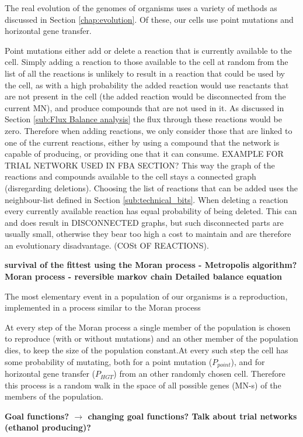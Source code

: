 \documentclass[10pt,a4paper]{article}
\begin{document}
	The real evolution of the genomes of organisms uses a variety of methods as discussed in Section \ref{chap:evolution}. Of these, our cells use point mutations and horizontal gene transfer.
	
	Point mutations either add or delete a reaction that is currently available to the cell. Simply adding a reaction to those available to the cell at random from the list of all the reactions is unlikely to result in a reaction that could be used by the cell, as with a high probability the added reaction would use reactants that are not present in the cell (the added reaction would be disconnected from the current MN), and produce compounds that are not used in it. As discussed in Section \ref{sub:Flux Balance analysis} the flux through these reactions would be zero. Therefore when adding reactions, we only consider those that are linked  to one of the current reactions, either by using a compound that  the network is capable of producing, or providing one that it can consume. EXAMPLE FOR TRIAL NETWORK USED IN FBA SECTION? This way the graph of the reactions and compounds available to the cell stays a connected graph (disregarding deletions). Choosing the list of reactions that can be added uses the neighbour-list defined in Section \ref{sub:technical_bits}. When deleting a reaction every currently available reaction has equal probability of being deleted. This can and does result in DISCONNECTED graphs, but such disconnected parts are usually small, otherwise they bear too high a cost to maintain and are therefore an evolutionary disadvantage. (COSt OF REACTIONS).  
	
\textbf{survival of the fittest using the Moran process - Metropolis algorithm?
Moran process - reversible markov chain
Detailed balance equation}


The most elementary event in a population of our organisms is a reproduction, implemented in a process similar to the Moran process \cite{moranprocess} 

At every step of the Moran process a single member of the population is chosen to reproduce (with or without mutations) and an other member of the population dies, to keep the size of the population constant.At every such step the cell has some probability of mutating, both for a point mutation ($P_{point}$), and for horizontal gene transfer ($P_{HGT}$) from an other randomly chosen cell.  Therefore this process is a random walk in the space of all possible genes (MN-s) of the members of the population. 


\textbf{Goal functions? $\rightarrow$ changing goal functions? Talk about trial networks (ethanol producing)?}
\end{document}
